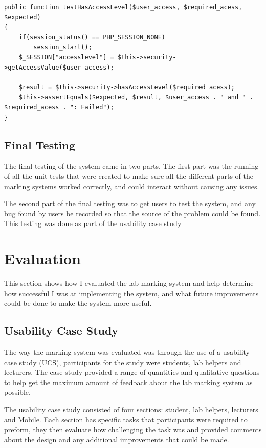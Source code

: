 \documentclass[12pt]{article}  %
\begin{document}
\singlespacing
\begin{lstlisting}[basicstyle=\linespread{0.8}, caption= hasAccessLevel Test, label = lst:hasAccess-test]
public function testHasAccessLevel($user_access, $required_acess, $expected)
{
    if(session_status() == PHP_SESSION_NONE)
        session_start();
    $_SESSION["accesslevel"] = $this->security->getAccessValue($user_access);

    $result = $this->security->hasAccessLevel($required_acess);
    $this->assertEquals($expected, $result, $user_access . " and " . $required_acess . ": Failed");
}
\end{lstlisting}
\doublespacing



\subsection{Final Testing}

The final testing of the system came in two parts. The first part was the running of all the unit tests that were created to make sure all the different parts of the marking systems worked correctly, and could interact without causing any issues.

The second part of the final testing was to get users to test the system, and any bug found by users be recorded so that the source of the problem could be found. This testing was done as part of the usability case study 


\newpage
\section{Evaluation}

This section shows how I evaluated the lab marking system and help determine how successful I was at implementing the system, and what future improvements could be done to make the system more useful. 

\subsection{Usability Case Study}
The way the marking system was evaluated was through the use of a usability case study (UCS), participants for the study were students, lab helpers and lecturers. The case study provided a range of quantities and qualitative questions to help get the maximum amount of feedback about the lab marking system as possible. 


The usability case study consisted of four sections: student, lab helpers, lecturers and Mobile. Each section has specific tasks that participants were required to preform, they then evaluate how challenging the task was and provided comments about the design and any additional improvements that could be made. 
\end{document}
